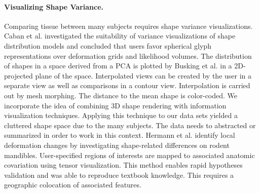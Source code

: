 \documentclass[journal]{style/vgtc} 			          %
\begin{document}
\paragraph{Visualizing Shape Variance.}
Comparing tissue between many subjects requires shape variance visualizations.
%
Caban et al. \cite{Caban2011} investigated the suitability of variance visualizations of shape distribution models and concluded that users favor spherical glyph representations over deformation grids and likelihood volumes.
%
The distribution of shapes in a space derived from a PCA is plotted by Busking et al. \cite{Busking2010a} in a 2D-projected plane of the space.
%
Interpolated views can be created by the user in a separate view as well as comparisons in a contour view.
%
Interpolation is carried out by mesh morphing.
%
The distance to the mean shape is color-coded.
%
We incorporate the idea of combining 3D shape rendering with information visualization techniques.
%
Applying this technique to our data sets yielded a cluttered shape space due to the many subjects.
%
The data needs to abstracted or summarized in order to work in this context.
%
Hermann et al. \cite{Hermann2014} identify local deformation changes by investigating shape-related differences on rodent mandibles.
%
User-specified regions of interests are mapped to associated anatomic covariation using tensor visualization.
%
This method enables rapid hypotheses validation and was able to reproduce textbook knowledge.
%
%
This requires a geographic colocation of associated features.
%

\end{document}
